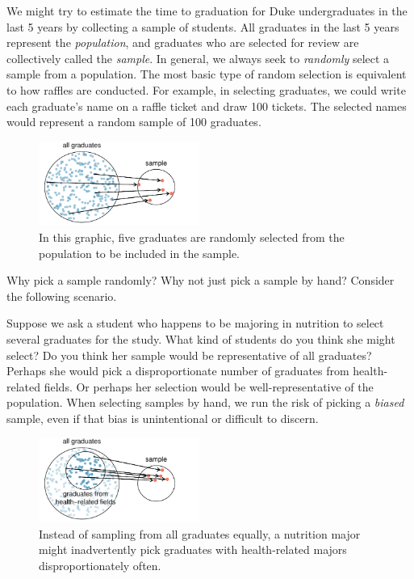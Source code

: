 
We might try to estimate the time to graduation for Duke undergraduates in the last 5 years by collecting a sample of students. All graduates in the last 5 years represent the \emph{population}, and graduates who are selected for review are collectively called the \emph{sample}. In general, we always seek to \emph{randomly} select a sample from a population. The most basic type of random selection is equivalent to how raffles are conducted. For example, in selecting graduates, we could write each graduate's name on a raffle ticket and draw 100 tickets. The selected names would represent a random sample of 100 graduates.

\begin{figure}[ht]
\centering
\includegraphics[width=0.47\textwidth]{ch_data_collection/figures/popToSample/popToSampleGraduates}
\caption{In this graphic, five graduates are randomly selected from the population to be included in the sample.}
\label{popToSampleGraduates}
\end{figure}

Why pick a sample randomly? Why not just pick a sample by hand? Consider the following scenario.

\begin{examplewrap}
\begin{nexample}{Suppose we ask a student who happens to be majoring in nutrition to select several graduates for the study. What kind of students do you think she might select? Do you think her sample would be representative of all graduates?}
Perhaps she would pick a disproportionate number of graduates from health-related fields. Or perhaps her selection would be well-representative of the population. When selecting samples by hand, we run the risk of picking a \emph{biased} sample, even if that bias is unintentional or difficult to discern.
\end{nexample}
\end{examplewrap}

\begin{figure}
\centering
\includegraphics[width=0.47\textwidth]{ch_data_collection/figures/popToSample/popToSubSampleGraduates}
\caption{Instead of sampling from all graduates equally, a nutrition major might inadvertently pick graduates with health-related majors disproportionately often.}
\label{popToSubSampleGraduates}
\end{figure}


